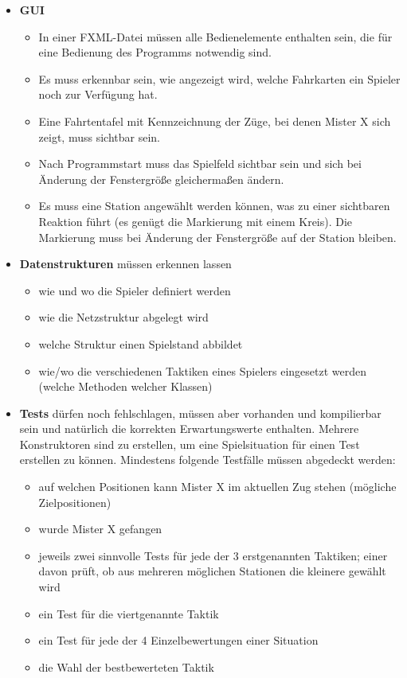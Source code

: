         \begin{itemize}
            \item \textbf{GUI}
                \begin{itemize}
                    \item In einer FXML-Datei müssen alle Bedienelemente enthalten sein, die für eine Bedienung des Programms notwendig sind.
                    \item Es muss erkennbar sein, wie angezeigt wird, welche Fahrkarten ein Spieler noch zur Verfügung hat.
                    \item Eine Fahrtentafel mit Kennzeichnung der Züge, bei denen Mister X sich zeigt, muss sichtbar sein.
                    \item Nach Programmstart muss das Spielfeld sichtbar sein und sich bei Änderung der Fenstergröße gleichermaßen ändern.
                    \item Es muss eine Station angewählt werden können, was zu einer sichtbaren Reaktion führt (es genügt die Markierung mit einem Kreis). Die Markierung muss bei Änderung der Fenstergröße auf der Station bleiben.
                \end{itemize}
            \item \textbf{Datenstrukturen} müssen erkennen lassen
                \begin{itemize}
                    \item wie und wo die Spieler definiert werden
                    \item wie die Netzstruktur abgelegt wird
                    \item welche Struktur einen Spielstand abbildet
                    \item wie/wo die verschiedenen Taktiken eines Spielers eingesetzt werden (welche Methoden welcher Klassen)
                \end{itemize}
            \item \textbf{Tests} dürfen noch fehlschlagen, müssen aber vorhanden und kompilierbar sein und natürlich die korrekten Erwartungswerte enthalten. Mehrere Konstruktoren sind zu erstellen, um eine Spielsituation für einen Test erstellen zu können. Mindestens folgende Testfälle müssen abgedeckt werden:
                \begin{itemize}
                    \item auf welchen Positionen kann Mister X im aktuellen Zug stehen (mögliche Zielpositionen)
                    \item wurde Mister X gefangen
                    \item jeweils zwei sinnvolle Tests für jede der 3 erstgenannten Taktiken; einer davon prüft, ob aus mehreren möglichen Stationen die kleinere gewählt wird
                    \item ein Test für die viertgenannte Taktik
                    \item ein Test für jede der 4 Einzelbewertungen einer Situation
                    \item die Wahl der bestbewerteten Taktik
                \end{itemize}
        \end{itemize}